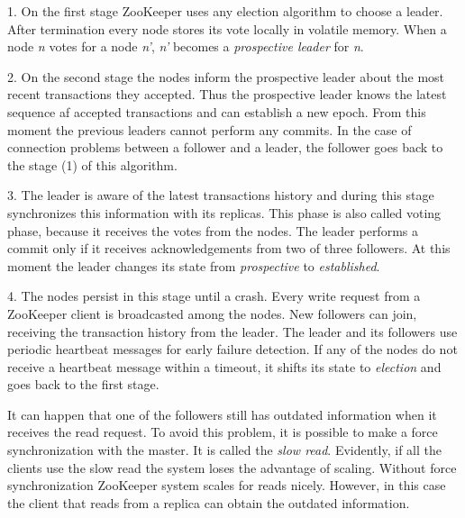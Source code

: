 1. On the first stage ZooKeeper uses any election algorithm to choose a leader.
After termination every node stores its vote locally in volatile memory.
When a node \textit{n} votes for a node \textit{n'}, \textit{n'} becomes a \textit{prospective leader} for \textit{n}.

2. On the second stage the nodes inform the prospective leader about the most recent transactions they accepted.
Thus the prospective leader knows the latest sequence af accepted transactions and can establish a new epoch.
From this moment the previous leaders cannot perform any commits.
In the case of connection problems between a follower and a leader, the follower goes back to the stage (1) of this algorithm.

3. The leader is aware of the latest transactions history and during this stage synchronizes this information with its replicas.
This phase is also called voting phase, because it receives the votes from the nodes.
The leader performs a commit only if it receives acknowledgements from two of three followers.
At this moment the leader changes its state from \textit{prospective} to \textit{established}.

4. The nodes persist in this stage until a crash.
Every write request from a ZooKeeper client is broadcasted among the nodes.
New followers can join, receiving the transaction history from the leader.
The leader and its followers use periodic heartbeat messages for early failure detection.
If any of the nodes do not receive a heartbeat message within a timeout, it shifts its state to \textit{election} and goes back to the first stage.

It can happen that one of the followers still has outdated information when it receives the read request.
To avoid this problem, it is possible to make a force synchronization with the master.
It is called the \textit{slow read}.
Evidently, if all the clients use the slow read the system loses the advantage of scaling.
Without force synchronization ZooKeeper system scales for reads nicely. 
However, in this case the client that reads from a replica can obtain the outdated information.